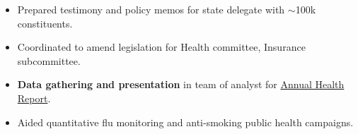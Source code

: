 \documentclass[margin]{res}
\begin{document}
\begin{sloppypar}
\begin{resume}
\begin{itemize}
    \item Prepared testimony and policy memos for state delegate with $\sim$100k constituents. 
    \item Coordinated to amend legislation for Health committee, Insurance subcommittee.
\end{itemize}

\begin{itemize}
    \item \textbf{Data gathering and presentation} in team of analyst for \href{http://www.baltimorehealth.org/hsr2008.html}{Annual Health Report}. 
\item Aided quantitative flu monitoring and anti-smoking public health campaigns.
\end{itemize}


\end{resume}
\end{sloppypar}
\end{document}
